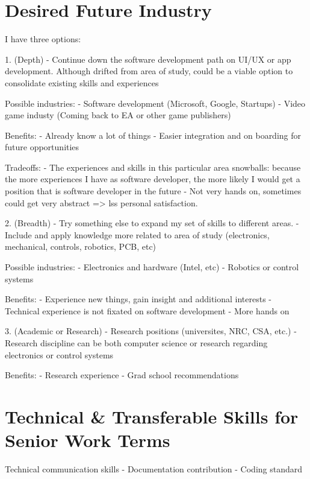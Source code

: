 \documentclass[10pt,letterpaper]{article}
\begin{document}
\section{Desired Future Industry}\label{desired-future-industry}


I have three options:

1. (Depth)
- Continue down the software development path on UI/UX or app development. Although drifted from area of study, could be a viable option to consolidate existing skills and experiences

Possible industries:
- Software development (Microsoft, Google, Startups)
- Video game industy (Coming back to EA or other game publishers)

Benefits:
- Already know a lot of things
- Easier integration and on boarding for future opportunities

Tradeoffs:
- The experiences and skills in this particular area snowballs: because the more experiences I have as software developer, the more likely I would get a position that is software developer in the future
- Not very hands on, sometimes could get very abstract => lss personal satisfaction.

2. (Breadth)
- Try something else to expand my set of skills to different areas.
- Include and apply knowledge more related to area of study (electronics, mechanical, controls, robotics, PCB, etc)

Possible industries:
- Electronics and hardware (Intel, etc)
- Robotics or control systems

Benefits:
- Experience new things, gain insight and additional interests
- Technical experience is not fixated on software development
- More hands on

3. (Academic or Research)
- Research positions (universites, NRC, CSA, etc.)
- Research discipline can be both computer science or research regarding electronics or control systems

Benefits:
- Research experience
- Grad school recommendations

\section{Technical \& Transferable Skills for Senior Work Terms}\label{transferable-skills}

Technical communication skills
- Documentation contribution
- Coding standard
\end{document}
